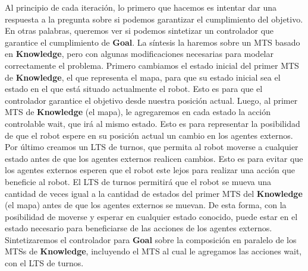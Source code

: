 Al principio de cada iteración, lo primero que hacemos es intentar dar una respuesta a la pregunta sobre si podemos garantizar el cumplimiento del objetivo.
En otras palabras, queremos ver si podemos sintetizar un controlador que garantice el cumplimiento de \textbf{Goal}.
La síntesis la haremos sobre un MTS basado en \textbf{Knowledge}, pero con algunas modificaciones necesarias para modelar correctamente el problema.
Primero cambiamos el estado inicial del primer MTS de \textbf{Knowledge}, el que representa el mapa, para que su estado inicial sea el estado en el que está
situado actualmente el robot. Esto es para que el controlador garantice el objetivo desde nuestra posición actual.
Luego, al primer MTS de \textbf{Knowledge} (el mapa), le agregaremos en cada estado la acción controlable wait, que irá al mismo estado.
Esto es para representar la posibilidad de que el robot espere en su posición actual un cambio en los agentes externos.
Por último creamos un LTS de turnos, que permita al robot moverse a cualquier estado antes de que los agentes externos realicen cambios. Esto es para evitar que los
agentes externos esperen que el robot este lejos para realizar una acción que beneficie al robot. El LTS de turnos permitirá que el robot se mueva una cantidad
de veces igual a la cantidad de estados del primer MTS del \textbf{Knowledge} (el mapa) antes de que los agentes externos se muevan.
De esta forma, con la posibilidad de moverse y esperar en cualquier estado conocido, puede estar en el estado necesario para beneficiarse de las acciones de
los agentes externos. Sintetizaremos el controlador para \textbf{Goal} sobre la composición en paralelo de los MTSs de \textbf{Knowledge}, incluyendo el MTS al
cual le agregamos las acciones wait, con el LTS de turnos.

